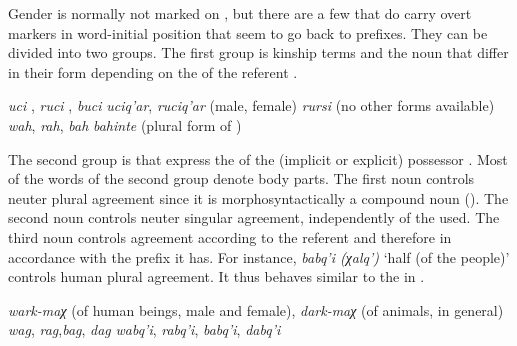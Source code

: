 Gender is normally not marked on , but there are a few  that do carry overt  markers in word-initial position that seem to go back to  prefixes. They can be divided into two groups. The first group is kinship terms and the noun  that differ in their form depending on the  of the referent . 
%
\begin{exe}
	\ex	\label{ex:nounsovertgendermarkers}
	\begin{xlist}
		\ex	\textit{uc{\lmk}i} , \textit{ruc{\lmk}i} , \textit{buc{\lmk}i} 
		\ex	\textit{uc{\lmk}iq'ar}, \textit{ruc{\lmk}iq'ar}  (male, female)
		\ex	\textit{rurs{\lmk}i}  (no other forms available)
		\ex	\textit{wah}, \textit{rah}, \textit{bah} 
		\ex	\textit{bahinte}  (plural form of )
	\end{xlist}
	\end{exe}
	
The second group is  that express the  of the (implicit or explicit) possessor . Most of the words of the second group denote body parts. The first noun controls neuter plural agreement since it is morphosyntactically a compound noun (). The second noun controls neuter singular agreement, independently of the  used. The third noun controls agreement according to the referent and therefore in accordance with the prefix it has. For instance, \textit{babq'i (χalq')} `half (of the people)' controls human plural agreement. It thus behaves similar to the  in .
	
\begin{exe}	
		\ex	\label{ex:nounsovertgendermarkers2}
	\begin{xlist}
		\ex	\textit{wark-maχ}  (of human beings, male and female), \textit{dark-maχ}  (of animals, in general) 
		\ex	\textit{wag}, \textit{rag},\textit{bag}, \textit{dag} \sqt{middle, waist}
		\ex	\textit{wabq'i},\textit{ rabq'i}, \textit{babq'i},\textit{ dabq'i} \sqt{half} 
	\end{xlist}
\end{exe}

